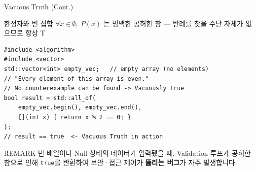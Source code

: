 \documentclass[10.5pt,compress]{beamer}
\begin{document}
\begin{frame}[fragile,t]{Vacuous Truth (Cont.)}
    \footnotesize
    \begin{block}{한정자와 빈 집합}
        $\forall x \in \emptyset,\; P(x)$ 는 명백한 공허한 참 — 반례를 찾을 수단 자체가 없으므로 항상 T
    \end{block}

\begin{lstlisting}[style=cpp]
#include <algorithm>
#include <vector>
std::vector<int> empty_vec;   // empty array (no elements)
// "Every element of this array is even."
// No counterexample can be found -> Vacuously True
bool result = std::all_of(
    empty_vec.begin(), empty_vec.end(),
    [](int x) { return x % 2 == 0; }
);
// result == true  <- Vacuous Truth in action
\end{lstlisting}

    \begin{alertblock}{REMARK}
        \scriptsize
        빈 배열이나 Null 상태의 데이터가 입력됐을 때, Validation 루프가 공허한 참으로 인해
        \texttt{true}를 반환하여 보안·접근 제어가 \textbf{뚫리는 버그}가 자주 발생합니다.
    \end{alertblock}
\end{frame}
\end{document}
